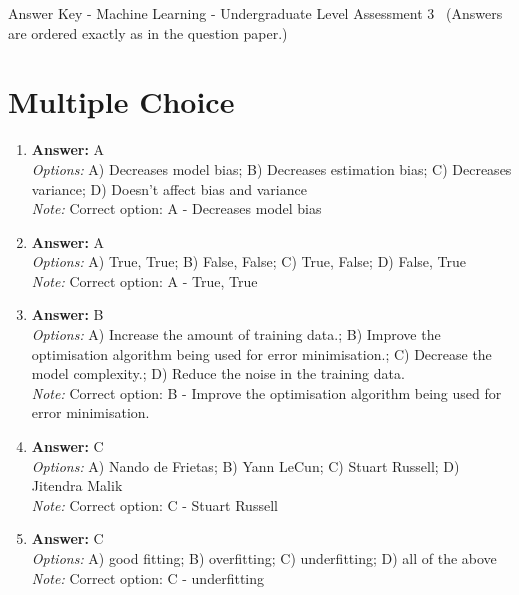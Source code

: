 \documentclass[12pt]{article}
\begin{document}
\begin{center}
Answer Key - Machine Learning - Undergraduate Level Assessment 3 \
\small (Answers are ordered exactly as in the question paper.)
\end{center}

\section*{Multiple Choice}
\begin{enumerate}[label=\arabic*.]
\item \textbf{Answer:} A
\\ \textit{Options:} A) Decreases model bias; B) Decreases estimation bias; C) Decreases variance; D) Doesn't affect bias and variance
\\ \textit{Note:} Correct option: A - Decreases model bias
\item \textbf{Answer:} A
\\ \textit{Options:} A) True, True; B) False, False; C) True, False; D) False, True
\\ \textit{Note:} Correct option: A - True, True
\item \textbf{Answer:} B
\\ \textit{Options:} A) Increase the amount of training data.; B) Improve the optimisation algorithm being used for error minimisation.; C) Decrease the model complexity.; D) Reduce the noise in the training data.
\\ \textit{Note:} Correct option: B - Improve the optimisation algorithm being used for error minimisation.
\item \textbf{Answer:} C
\\ \textit{Options:} A) Nando de Frietas; B) Yann LeCun; C) Stuart Russell; D) Jitendra Malik
\\ \textit{Note:} Correct option: C - Stuart Russell
\item \textbf{Answer:} C
\\ \textit{Options:} A) good fitting; B) overfitting; C) underfitting; D) all of the above
\\ \textit{Note:} Correct option: C - underfitting
\end{enumerate}
\end{document}
